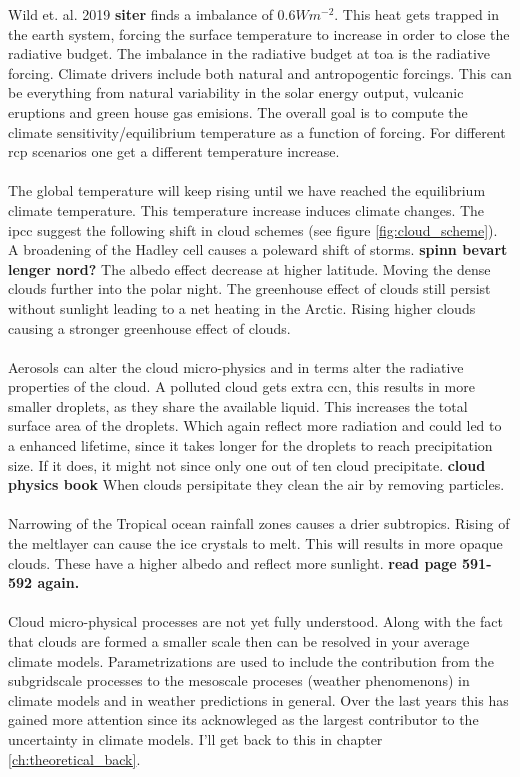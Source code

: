 Wild et. al. 2019  \textbf{siter} finds a imbalance of $0.6W m^{-2}$. This heat gets trapped in the earth system, forcing the surface temperature to increase in order to close the radiative budget. The imbalance in the radiative budget at \acrshort{toa} is the radiative forcing. Climate drivers include both natural and antropogentic forcings. This can be everything from natural variability in the solar energy output, vulcanic eruptions and green house gas emisions. The overall goal is to compute the climate sensitivity/equilibrium temperature as a function of forcing. For different \acrfull{rcp} scenarios one get a different temperature increase.
\\ \\ 
The global temperature will keep rising until we have reached the equilibrium climate temperature. This temperature increase induces climate changes. The \acrshort{ipcc} suggest the following shift in cloud schemes (see figure \ref{fig:cloud_scheme}). A broadening of the Hadley cell causes a poleward shift of storms. \textbf{spinn bevart lenger nord?} The albedo effect decrease at higher latitude. Moving the dense clouds further into the polar night. %
The greenhouse effect of clouds still persist without sunlight leading to a net heating in the Arctic. Rising higher clouds causing a stronger greenhouse effect of clouds.
\\ \\
Aerosols can alter the cloud micro-physics and in terms alter the radiative properties of the cloud. A polluted cloud gets extra \acrshort{ccn}, this results in more smaller droplets, as they share the available liquid. This increases the total surface area of the droplets. Which again reflect more radiation and could led to a enhanced lifetime, since it takes longer for the droplets to reach precipitation size. If it does, it might not since only one out of ten cloud precipitate. \textbf{cloud physics book} When clouds persipitate they clean the air by removing particles.
\\ \\ 
Narrowing of the Tropical ocean rainfall zones causes a drier subtropics. Rising of the meltlayer can cause the ice crystals to melt. This will results in more opaque clouds. These have a higher albedo and reflect more sunlight. \textbf{read page 591-592 again.}
\\ \\
Cloud micro-physical processes are not yet fully understood. Along with the fact that clouds are formed a smaller scale then can be resolved in your average climate models. Parametrizations are used to include the contribution from the subgridscale processes to the mesoscale proceses (weather phenomenons) in climate models and in weather predictions in general. Over the last years this has gained more attention since its acknowleged as the largest contributor to the uncertainty in climate models. I'll get back to this in chapter \ref{ch:theoretical_back}.

